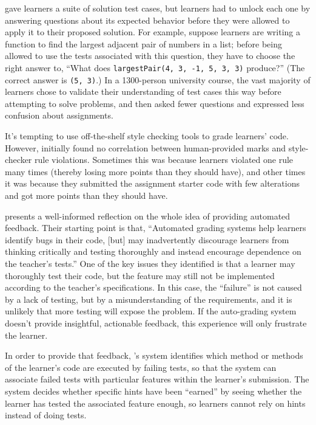 \cite{Basu2015} gave learners a suite of solution test cases, but
learners had to unlock each one by answering questions about its
expected behavior before they were allowed to apply it to their
proposed solution.  For example, suppose learners are writing a
function to find the largest adjacent pair of numbers in a list;
before being allowed to use the tests associated with this question,
they have to choose the right answer to, ``What does
\texttt{largestPair(4, 3, -1, 5, 3, 3)} produce?''  (The correct
answer is \texttt{(5, 3)}.)  In a 1300-person university course, the
vast majority of learners chose to validate their understanding of
test cases this way before attempting to solve problems, and then
asked fewer questions and expressed less confusion about assignments.

It's tempting to use off-the-shelf style checking tools to grade
learners' code.  However, \cite{Nutb2016} initially found no
correlation between human-provided marks and style-checker rule
violations.  Sometimes this was because learners violated one rule
many times (thereby losing more points than they should have), and
other times it was because they submitted the assignment starter code
with few alterations and got more points than they should have.

\cite{Buff2015} presents a well-informed reflection on the whole idea
of providing automated feedback.  Their starting point is that,
``Automated grading systems help learners identify bugs in their code,
{[}but{]} may inadvertently discourage learners from thinking
critically and testing thoroughly and instead encourage dependence on
the teacher's tests.''  One of the key issues they identified is that
a learner may thoroughly test their code, but the feature may still
not be implemented according to the teacher's specifications.  In this
case, the ``failure'' is not caused by a lack of testing, but by a
misunderstanding of the requirements, and it is unlikely that more
testing will expose the problem.  If the auto-grading system doesn't
provide insightful, actionable feedback, this experience will only
frustrate the learner.

In order to provide that feedback, \cite{Buff2015}'s system identifies
which method or methods of the learner's code are executed by failing
tests, so that the system can associate failed tests with particular
features within the learner's submission.  The system decides whether
specific hints have been ``earned'' by seeing whether the learner has
tested the associated feature enough, so learners cannot rely on hints
instead of doing tests.

